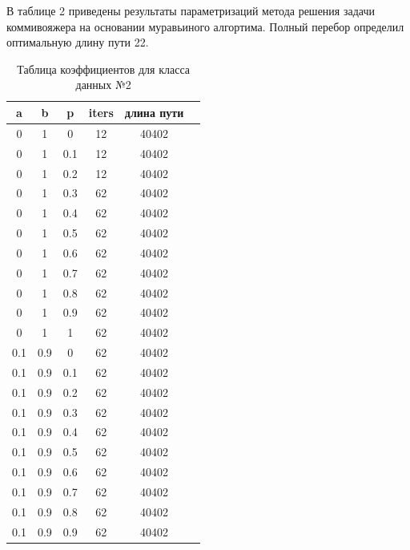 \documentclass[a4paper,12pt]{article}
\begin{document}
	    В таблице 2 приведены результаты параметризаций метода решения задачи коммивояжера на основании муравьиного алгортима. Полный перебор определил оптимальную длину пути 22.

\begin{table}[!h]	
\caption{Таблица коэффициентов для класса данных №2}
	\begin{center}
		\begin{tabular}{c@{\hspace{7mm}}c@{\hspace{7mm}}c@{\hspace{7mm}}c@{\hspace{7mm}}c@{\hspace{7mm}}c}
			
			\toprule
			a        &b      &p      &iters &длина пути \\
			\midrule
			0       &1      &0      &12    &40402\\
			0       &1      &0.1    &12    &40402\\
			0       &1      &0.2    &12    &40402\\
			0       &1      &0.3    &62    &40402\\
			0       &1      &0.4    &62    &40402\\
			0       &1      &0.5    &62    &40402\\
			0       &1      &0.6    &62    &40402\\
			0       &1      &0.7    &62    &40402\\
			0       &1      &0.8    &62    &40402\\
			0       &1      &0.9    &62    &40402\\
			0       &1      &1      &62    &40402\\
			\midrule
			0.1     &0.9    &0      &62    &40402\\
			0.1     &0.9    &0.1    &62    &40402\\
			0.1     &0.9    &0.2    &62    &40402\\
			0.1     &0.9    &0.3    &62    &40402\\
			0.1     &0.9    &0.4    &62    &40402\\
			0.1     &0.9    &0.5    &62    &40402\\
			0.1     &0.9    &0.6    &62    &40402\\
			0.1     &0.9    &0.7    &62    &40402\\
			0.1     &0.9    &0.8    &62    &40402\\
			0.1     &0.9    &0.9    &62    &40402\\

\end{tabular}
\end{center}
\end{table}
\end{document}
